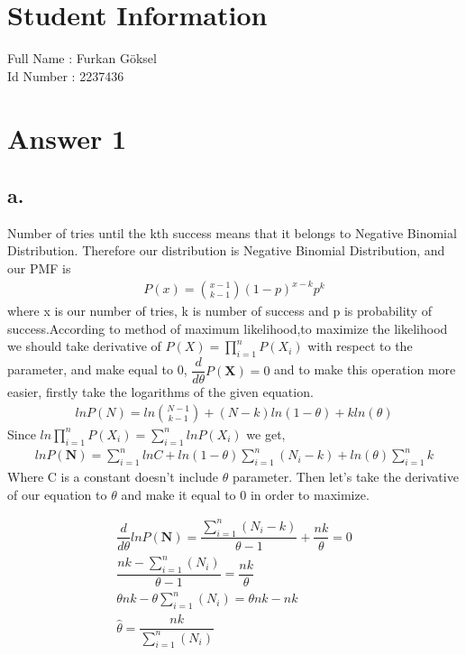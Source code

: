 \documentclass[12pt]{article}
\begin{document}
\section*{Student Information } 
Full Name : Furkan Göksel \\
Id Number : 2237436 \\

\section*{Answer 1}

\subsection*{a.}
Number of tries until the kth success means that it belongs to Negative Binomial Distribution. Therefore our distribution is Negative Binomial Distribution, and our PMF is 
\begin{gather*}
    P(x)=\binom{x-1}{k-1}(1-p)^{x-k}p^k
\end{gather*}
where x is our number of tries, k is number of success and p is probability of success.According to method of maximum likelihood,to maximize the likelihood we should take derivative of $P(X)=\prod_{i=1}^{n}P(X_i)$ with respect to the parameter, and make equal to 0, $\dfrac{d}{d\theta}P(\textbf{X}) = 0$ and to make this operation more easier, firstly take the logarithms of the given equation.
\begin{gather*}
    lnP(N) = ln\binom{N-1}{k-1}+(N-k)ln(1-\theta)+kln(\theta)
\end{gather*}
Since $ln\prod_{i=1}^{n}P(X_i)=\sum_{i=1}^n lnP(X_i)$ we get,
\begin{gather*}
    lnP(\textbf{N}) = \sum_{i=1}^n lnC + ln(1-\theta) \sum_{i=1}^n(N_i-k)+ln(\theta) \sum_{i=1}^nk
\end{gather*}
Where C is a constant doesn't include $\theta$ parameter. Then let's take the derivative of our equation to $\theta$ and make it equal to 0 in order to maximize.

\begin{gather*}
    \dfrac{d}{d\theta}lnP(\textbf{N}) = \dfrac{\sum_{i=1}^n(N_i-k)}{\theta-1}+\dfrac{nk}{\theta}=0 \\
    \dfrac{nk-\sum_{i=1}^n(N_i)}{\theta -1}=\dfrac{nk}{\theta} \\
    \theta nk -\theta \sum_{i=1}^n (N_i) = \theta nk -nk \\
    \hat{\theta}= \dfrac{nk}{\sum_{i=1}^n (N_i)}
\end{gather*}
\end{document}
